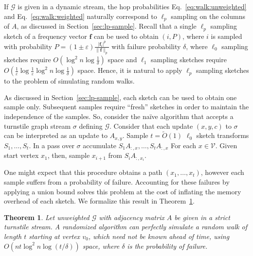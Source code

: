 \documentclass[10]{report}
\newtheorem{theorem}{Theorem}[section]
\begin{document}
If $\mathcal{G}$ is given in a dynamic stream, the hop probabilities Eq.~\eqref{eq:walk:unweighted} and Eq.~\ref{eq:walk:weighted} naturally correspond to $\ell_p$ sampling on the columns of $A$, as discussed in Section~\ref{sec:lp-sample}.
Recall that a single $\ell_p$ sampling sketch of a frequency vector $\mathbf{f}$ can be used to obtain $(i, P)$, where $i$ is sampled with probability $P = (1 \pm \varepsilon)\frac{|\mathbf{f}_i|^p}{\|\mathbf{f}\|_p}$ with failure probability $\delta$, where $\ell_0$ sampling sketches require $O \left ( \log^2 n \log \frac{1}{\delta} \right)$ space and $\ell_1$ sampling sketches require $O \left ( \frac{1}{\varepsilon} \log \frac{1}{\varepsilon} \log^2 n \log \frac{1}{\delta} \right )$ space.
Hence, it is natural to apply $\ell_p$ sampling sketches to the problem of simulating random walks.


As discussed in Section~\ref{sec:lp-sample}, each sketch can be used to obtain one sample only. 
Subsequent samples require ``fresh'' sketches in order to maintain the independence of the samples.
So, consider the na\"ive algorithm that accepts a turnstile graph stream $\sigma$ defining $\mathcal{G}$.
Consider that each update $(x, y, c)$ to $\sigma$ can be interpreted as an update to $A_{x,y}$.
Sample $t = \widetilde{O}(1)$ $\ell_0$ sketch transforms $S_1, \dots, S_t$. 
In a pass over $\sigma$ accumulate $S_1A_{:,x}, \dots, S_t A_{:,x}$ For each $x \in \mathcal{V}$.
Given start vertex $x_1$, then, sample $x_{i+1}$ from $S_i A_{:, x_i}$.

One might expect that this procedure obtains a path $(x_1, \dots, x_t)$, however each sample suffers from a probability of failure. 
Accounting for these failures by applying a union bound solves this problem at the cost of inflating the memory overhead of each sketch.
We formalize this result in Theorem~\ref{thm:rw:sampling:turnstile}.
%
\begin{theorem} \label{thm:rw:sampling:turnstile}
Let unweighted $\mathcal{G}$ with adjacency matrix $A$ be given in a strict turnstile stream.
A randomized algorithm can perfectly simulate a random walk of length $t$  starting at vertex $v_0$, which need not be known ahead of time, using $O(nt\log^2 n \log (t/\delta))$ space, where $\delta$ is the probability of failure.
\end{theorem}
\end{document}
